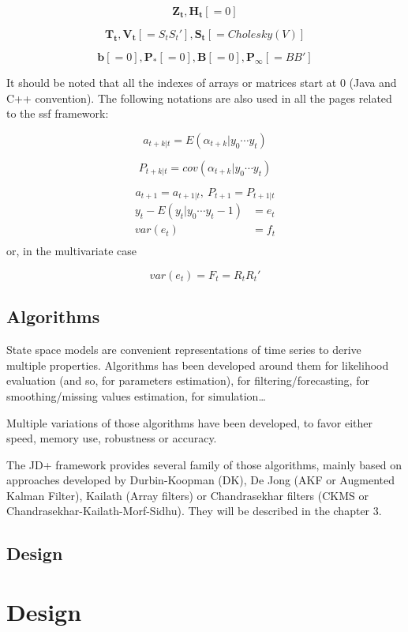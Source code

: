 \documentclass[
  letterpaper,
  DIV=11,
  numbers=noendperiod]{scrreprt}
\begin{document}
\[ \mathbf{Z_t}, \mathbf{H_t} [=0] \]

\[ \mathbf{T_t}, \mathbf{V_t} [=S_t S_t'], \mathbf{S_t} [=Cholesky(V)] \]

\[ \mathbf{b}[=0], \mathbf{P_*} [=0], \mathbf{B} [=0], \mathbf{P_\infty} [=BB'] \]

It should be noted that all the indexes of arrays or matrices start at
\(0\) (Java and C++ convention). The following notations are also used
in all the pages related to the ssf framework:

\[ a_{t+k|t}=E\left(\alpha_{t+k} | y_0 \cdots y_{t}\right)\]

\[ P_{t+k|t}=cov\left(\alpha_{t+k} | y_0 \cdots y_{t}\right)\]

\[ a_{t+1}=a_{t+1|t}, \: P_{t+1}=P_{t+1|t} \] \[ 
\begin{align*}
y_t - E(y_t| y_0 \cdots y_t-1) &= e_t \\
var(e_t) &= f_t \\
\end{align*}
\] or, in the multivariate case

\[ 
var(e_t) = F_t = R_t R_t'
\]

\section{Algorithms}\label{algorithms}

State space models are convenient representations of time series to
derive multiple properties. Algorithms has been developed around them
for likelihood evaluation (and so, for parameters estimation), for
filtering/forecasting, for smoothing/missing values estimation, for
simulation\ldots{}

Multiple variations of those algorithms have been developed, to favor
either speed, memory use, robustness or accuracy.

The JD+ framework provides several family of those algorithms, mainly
based on approaches developed by Durbin-Koopman (DK), De Jong (AKF or
Augmented Kalman Filter), Kailath (Array filters) or Chandrasekhar
filters (CKMS or Chandrasekhar-Kailath-Morf-Sidhu). They will be
described in the chapter 3.

\section{Design}\label{design}

\chapter{Design}\label{design-1}
\end{document}
